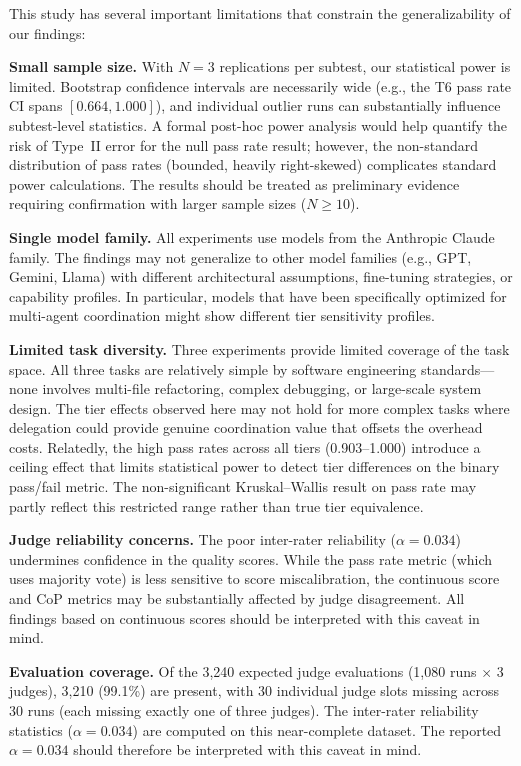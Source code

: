 \documentclass[11pt]{article}
\begin{document}
This study has several important limitations that constrain the
generalizability of our findings:

\textbf{Small sample size.} With $N=3$ replications per subtest, our
statistical power is limited. Bootstrap confidence intervals are necessarily
wide (e.g., the T6 pass rate CI spans $[0.664, 1.000]$), and individual
outlier runs can substantially influence subtest-level statistics. A formal post-hoc power analysis would help
quantify the risk of Type~II error for the null pass rate result; however,
the non-standard distribution of pass rates (bounded, heavily right-skewed)
complicates standard power calculations. The results should be treated as
preliminary evidence requiring confirmation with larger sample sizes
($N \geq 10$).

\textbf{Single model family.} All experiments use models from the Anthropic
Claude family. The findings may not generalize to other model families (e.g.,
GPT, Gemini, Llama) with different architectural assumptions, fine-tuning
strategies, or capability profiles. In particular, models that have been
specifically optimized for multi-agent coordination might show different tier
sensitivity profiles.

\textbf{Limited task diversity.} Three experiments provide limited coverage of
the task space. All three tasks are relatively simple by software engineering
standards---none involves multi-file refactoring, complex debugging, or
large-scale system design. The tier effects observed here may not hold for
more complex tasks where delegation could provide genuine coordination value
that offsets the overhead costs. Relatedly, the high pass rates across all
tiers (0.903--1.000) introduce a ceiling effect that limits statistical power
to detect tier differences on the binary pass/fail metric. The non-significant
Kruskal--Wallis result on pass rate may partly reflect this restricted range
rather than true tier equivalence.

\textbf{Judge reliability concerns.} The poor inter-rater reliability
($\alpha = 0.034$) undermines confidence in the quality scores. While the
pass rate metric (which uses majority vote) is less sensitive to score
miscalibration, the continuous score and CoP metrics may be substantially
affected by judge disagreement. All findings based on continuous scores
should be interpreted with this caveat in mind.

\textbf{Evaluation coverage.} Of the 3,240 expected judge
evaluations (1,080 runs $\times$ 3 judges), 3,210 (99.1\%) are present,
with 30 individual judge slots missing across 30 runs (each missing
exactly one of three judges). The inter-rater
reliability statistics ($\alpha = 0.034$) are computed on this near-complete
dataset. The reported
$\alpha = 0.034$ should therefore be interpreted with this caveat in mind.
\end{document}
